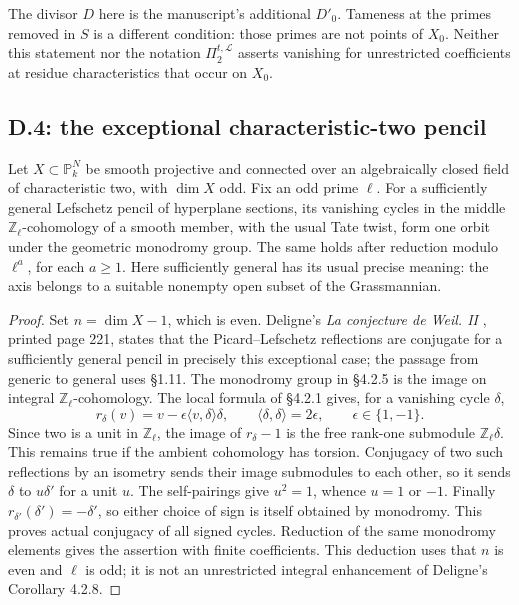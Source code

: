 The divisor $D$ here is the manuscript's additional $D'_0$.
Tameness at the primes removed in $S$ is a different condition: those
primes are not points of $X_0$. Neither this statement nor the
notation $\Pi_2^{t,\mathcal L}$ asserts vanishing for unrestricted
coefficients at residue characteristics that occur on $X_0$.

\subsection{D.4: the exceptional characteristic-two pencil}

\begin{proposition}
\label{D:vanishing-conjugacy}
Let $X\subset\mathbb P^N_k$ be smooth projective and connected over an
algebraically closed field of characteristic two, with $\dim X$ odd.
Fix an odd prime $\ell$. For a sufficiently general Lefschetz pencil
of hyperplane sections, its vanishing cycles in the middle
$\mathbb Z_\ell$-cohomology of a smooth member, with the usual Tate
twist, form one orbit under the geometric monodromy group. The same
holds after reduction modulo $\ell^a$, for each $a\geq1$.
Here sufficiently general has its usual precise meaning: the axis
belongs to a suitable nonempty open subset of the Grassmannian.
\end{proposition}
\begin{proof}
Set $n=\dim X-1$, which is even. Deligne's
\emph{La conjecture de Weil. II} \cite[\S4.2, Corollary 4.2.7(ii)]{Deligne1980D},
printed page 221, states that the Picard--Lefschetz reflections are
conjugate for a sufficiently general pencil in precisely this exceptional
case; the passage from generic to general uses \S1.11.
The monodromy group in \S4.2.5 is the image on integral
$\mathbb Z_\ell$-cohomology. The local formula of \S4.2.1 gives,
for a vanishing cycle $\delta$,
\[
 r_\delta(v)=v-\epsilon\langle v,\delta\rangle\delta,
 \qquad \langle\delta,\delta\rangle=2\epsilon,
 \qquad \epsilon\in\{1,-1\}.
\]
Since two is a unit in $\mathbb Z_\ell$, the image of
$r_\delta-1$ is the free rank-one submodule $\mathbb Z_\ell\delta$.
This remains true if the ambient cohomology has torsion. Conjugacy of
two such reflections by an isometry sends their image submodules to
each other, so it sends $\delta$ to $u\delta'$ for a unit $u$.
The self-pairings give $u^2=1$, whence $u=1$ or $-1$.
Finally $r_{\delta'}(\delta')=-\delta'$, so either choice of sign is
itself obtained by monodromy. This proves actual conjugacy of all
signed cycles. Reduction of the same monodromy elements gives the
assertion with finite coefficients. This deduction uses that $n$ is
even and $\ell$ is odd; it is not an unrestricted integral enhancement
of Deligne's Corollary 4.2.8.
\end{proof}

